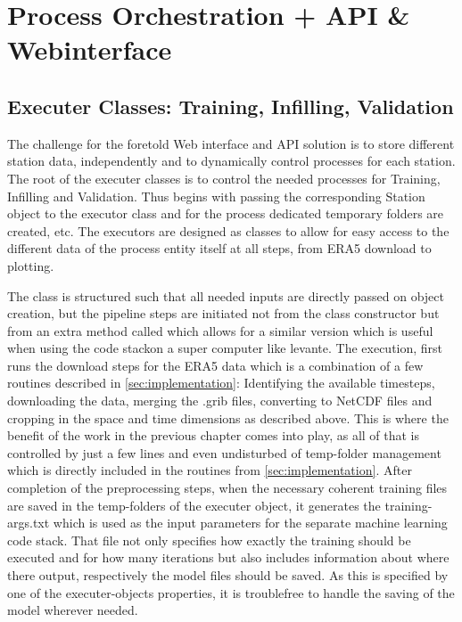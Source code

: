 
\section{Process Orchestration + API \& Webinterface}
\label{sec:process_orchestration}

\subsection{Executer Classes: Training, Infilling, Validation}

The challenge for the foretold Web interface and API solution is to store different station data, independently and to dynamically control processes for each station. The root of the executer classes is to control the needed processes for Training, Infilling and Validation. Thus begins with passing the corresponding Station object to the executor class and for the process dedicated temporary folders are created, etc. The executors are designed as classes to allow for easy access to the different data of the process entity itself at all steps, from ERA5 download to plotting.

The  class is structured such that all needed inputs are directly passed on object creation, but the pipeline steps are initiated not from the class constructor but from an extra method called  which allows for a similar  version which is useful when using the code stackon a super computer like levante.
The execution, first runs the download steps for the ERA5 data which is a combination of a few routines described in \autoref{sec:implementation}: Identifying the available timesteps, downloading the data, merging the .grib files, converting to NetCDF files and cropping in the space and time dimensions as described above. This is where the benefit of the work in the previous chapter comes into play, as all of that is controlled by just a few lines and even undisturbed of temp-folder management which is directly included in the routines from \autoref{sec:implementation}.
After completion of the preprocessing steps, when the necessary coherent training files are saved in the temp-folders of the executer object, it generates the training-args.txt which is used as the input parameters for the separate machine learning code stack. That file not only specifies how exactly the training should be executed and for how many iterations but also includes information about where there output, respectively the model files should be saved. As this is specified by one of the executer-objects properties, it is troublefree to handle the saving of the model wherever needed.

